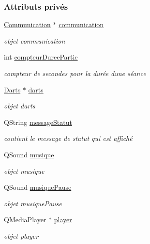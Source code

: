 \subsubsection*{Attributs privés}
\begin{DoxyCompactItemize}
\item 
\hyperlink{class_communication}{Communication} $\ast$ \hyperlink{class_ihm_a2f3d4781795781a840786cd8c2233899}{communication}
\begin{DoxyCompactList}\small\item\em objet communication \end{DoxyCompactList}\item 
int \hyperlink{class_ihm_a61e4a83f8ca0f177971af808e51be5bb}{compteur\+Duree\+Partie}
\begin{DoxyCompactList}\small\item\em compteur de secondes pour la durée d\textquotesingle{}une séance \end{DoxyCompactList}\item 
\hyperlink{class_darts}{Darts} $\ast$ \hyperlink{class_ihm_a2a0f54d33f4d6b2531ec2190c4a2356e}{darts}
\begin{DoxyCompactList}\small\item\em objet darts \end{DoxyCompactList}\item 
Q\+String \hyperlink{class_ihm_a31a25b36e5560142cb156b8b1a25965f}{message\+Statut}
\begin{DoxyCompactList}\small\item\em contient le message de statut qui est affiché \end{DoxyCompactList}\item 
Q\+Sound \hyperlink{class_ihm_a6e2a173ec36ee846d6210117b4b85fa8}{musique}
\begin{DoxyCompactList}\small\item\em objet musique \end{DoxyCompactList}\item 
Q\+Sound \hyperlink{class_ihm_a11e7ae529b6adb7ac98f1aa512172ff2}{musique\+Pause}
\begin{DoxyCompactList}\small\item\em objet musique\+Pause \end{DoxyCompactList}\item 
Q\+Media\+Player $\ast$ \hyperlink{class_ihm_a633230fb15d587e647ad9d2d6142ebc3}{player}
\begin{DoxyCompactList}\small\item\em objet player \end{DoxyCompactList}\item 

\end{DoxyCompactItemize}
